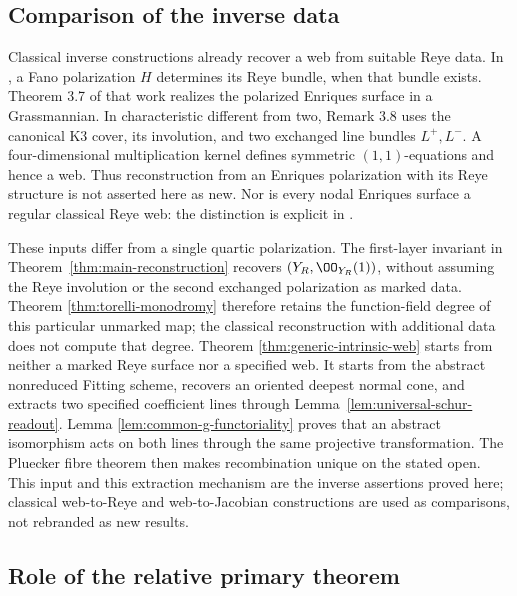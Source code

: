 \subsection{Comparison of the inverse data}
\label{sec:inverse-data-comparison}

Classical inverse constructions already recover a web from suitable
Reye data.  In \cite[Proposition 3.6]{MMV}, a Fano polarization
\(H\) determines its Reye bundle, when that bundle exists.
Theorem 3.7 of that work realizes the polarized Enriques surface in
a Grassmannian.  In characteristic different from two, Remark 3.8
uses the canonical K3 cover, its involution, and two exchanged line
bundles \(L^+,L^-\).  A four-dimensional multiplication kernel
defines symmetric \((1,1)\)-equations and hence a web.  Thus
reconstruction from an Enriques polarization with its Reye structure
is not asserted here as new.  Nor is every nodal Enriques surface a
regular classical Reye web: the distinction is explicit in
\cite[Remark 1.2 and Section 6]{MMV}.

These inputs differ from a single quartic polarization.  The first-layer
invariant in Theorem~\ref{thm:main-reconstruction} recovers
\((Y_R,\OO_{Y_R}(1))\), without assuming the Reye involution or
the second exchanged polarization as marked data.  Theorem
\ref{thm:torelli-monodromy} therefore retains the function-field
degree of this particular unmarked map; the classical reconstruction
with additional data does not compute that degree.  Theorem
\ref{thm:generic-intrinsic-web} starts from neither a marked Reye
surface nor a specified web.  It starts from the abstract nonreduced
Fitting scheme, recovers an oriented deepest normal cone, and extracts
two specified coefficient lines through
Lemma~\ref{lem:universal-schur-readout}.  Lemma
\ref{lem:common-g-functoriality} proves that an abstract isomorphism
acts on both lines through the same projective transformation.
The Pluecker fibre theorem then makes recombination unique on the
stated open.  This input and this extraction mechanism are the inverse
assertions proved here; classical web-to-Reye and web-to-Jacobian
constructions are used as comparisons, not rebranded as new results.

\subsection{Role of the relative primary theorem}
\label{sec:relative-tool-positioning}

